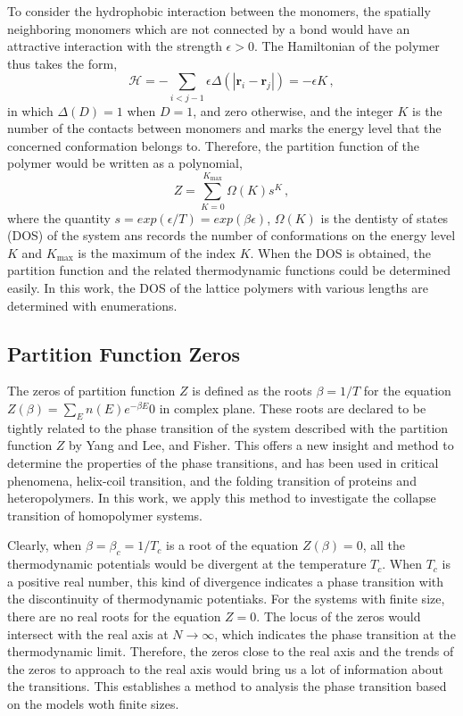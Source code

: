 \documentclass[preprint,preprintnumbers,amsmath,amssymb,showpacs,aps,pre]{revtex4-1}
\begin{document}
To consider the hydrophobic interaction between the monomers, the spatially
neighboring monomers which are not connected by a bond would have an attractive
interaction with the strength $\epsilon>0$. The Hamiltonian of the polymer thus
takes the form,
\begin{equation}
{\mathcal H}=-\sum_{i<j-1}\epsilon \Delta(|{\mathbf r}_i-{\mathbf r}_j|)=
-\epsilon K \, ,
\end{equation}
in which $\Delta(D)=1$ when $D=1$, and zero otherwise, and the integer $K$
is the number of the contacts between monomers and marks the energy level
that the concerned conformation belongs to. Therefore, the partition
function of the polymer would be written as a polynomial,
\begin{equation}
Z=\sum_{K=0}^{K_{\text{max}}} \Omega(K) s^K \, ,
\end{equation}
where the quantity $s=exp(\epsilon/T)=exp(\beta\epsilon)$, $\Omega(K)$ is the dentisty
of states (DOS) of the system ans records the number 
of conformations on the energy level $K$ and $K_{\text{max}}$ is the
maximum of the index $K$. When the DOS is obtained, the partition function and
the related thermodynamic functions could be determined easily. In this work,
the DOS of the lattice polymers with various lengths are determined with
enumerations.

\subsection{Partition Function Zeros}

The zeros of partition function $Z$ is defined as the roots $\beta=1/T$
for the equation $Z(\beta)=\sum_E n(E)e^{-\beta E}0$ in complex plane. These
roots are declared to be
tightly related to the phase transition of the system described with the
partition function $Z$ by Yang and Lee, and Fisher. This offers a new insight
and method to determine the properties of the phase transitions, and has been
used in critical phenomena, helix-coil transition, and the folding transition of
proteins and heteropolymers. In this work, we apply this method to investigate
the collapse transition of homopolymer systems.

Clearly, when $\beta=\beta_c=1/T_c$ is a root of the equation $Z(\beta)=0$, all
the thermodynamic potentials would be divergent at the temperature $T_c$. When
$T_c$ is a positive real number, this kind of divergence indicates a phase
transition with the discontinuity of thermodynamic potentiaks. For the systems
with finite size, there are no real roots for the equation $Z=0$. The locus of
the zeros would intersect with the real axis at $N\rightarrow\infty$, which
indicates the phase transition at the thermodynamic limit. Therefore, the zeros
close to the real axis and the trends of the zeros to approach to the real axis
would bring us a lot of information about the transitions. This establishes a
method to analysis the phase transition based on the models woth finite sizes.
\end{document}

